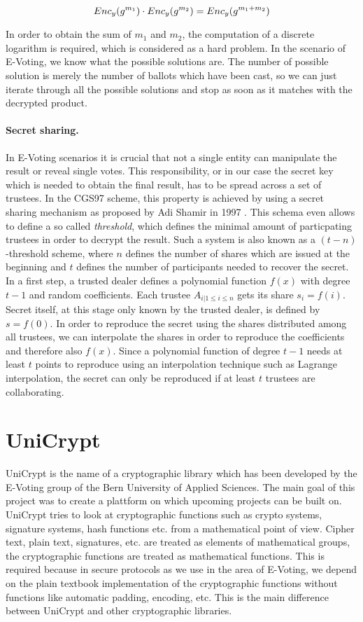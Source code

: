\documentclass[numbers=noenddot, abstract=on]{scrreprt}
\begin{document}
\begin{equation}
Enc_y(g^{m_1}) \cdot Enc_y(g^{m_2}) = Enc_y(g^{m_1 + m_2}) \notag
\end{equation}

In order to obtain the sum of $m_1$ and $m_2$, the computation of a discrete
logarithm is required, which is considered as a hard problem. In the scenario of
E-Voting, we know what the possible solutions are. The number of possible
solution is merely the number of ballots which have been cast, so we can just
iterate through all the possible solutions and stop as soon as it matches with
the decrypted product.

\paragraph{Secret sharing.} In E-Voting scenarios it is crucial that not a
single entity can manipulate the result or reveal single votes. This
responsibility, or in our case the secret key which is needed to obtain the
final result, has to be spread across a set of trustees. In the CGS97 scheme,
this property is achieved by using a secret sharing mechanism as proposed by Adi
Shamir in 1997 \cite{SHA79}. This schema even allows to define a so called
\textit{threshold}, which defines the minimal amount of particpating trustees in
order to decrypt the result. Such a system is also known as a
$(t-n)$-threshold scheme, where $n$ defines the number of shares which are
issued at the beginning and $t$ defines the number of participants needed to
recover the secret. In a first step, a trusted dealer defines a polynomial
function $f(x)$ with degree $t-1$ and random coefficients. Each trustee $A_{i |
1 \leq i \leq n}$ gets its share $s_i=f(i)$. Secret itself, at this stage only
known by the trusted dealer, is defined by $s=f(0)$. In order to reproduce the
secret using the shares distributed among all trustees, we can interpolate the
shares in order to reproduce the coefficients and therefore also $f(x)$. Since a
polynomial function of degree $t-1$ needs at least $t$ points to reproduce using
an interpolation technique such as Lagrange interpolation, the secret can only
be reproduced if at least $t$ trustees are collaborating. 

\section{UniCrypt}
UniCrypt is the name of a cryptographic library which has been developed by the
E-Voting group of the Bern University of Applied Sciences. The main goal of this
project was to create a plattform on which upcoming projects can be built on.
UniCrypt tries to look at cryptographic functions such as crypto systems,
signature systems, hash functions etc. from a mathematical point of view. Cipher
text, plain text, signatures, etc. are treated as elements of mathematical
groups, the cryptographic functions are treated as mathematical functions. This
is required because in secure protocols as we use in the area of E-Voting, we
depend on the plain textbook implementation of the cryptographic functions
without functions like automatic padding, encoding, etc. This is the main
difference between UniCrypt and other cryptographic libraries.
\end{document}
